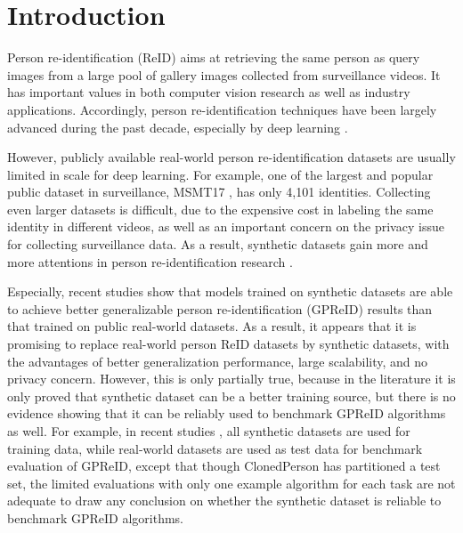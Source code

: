 \documentclass[10pt,twocolumn,letterpaper]{article}
\begin{document}
\section{Introduction}

Person re-identification (ReID) aims at retrieving the same person as query images from a large pool of gallery images collected from surveillance videos. It has important values in both computer vision research as well as industry applications. Accordingly, person re-identification techniques have been largely advanced during the past decade, especially by deep learning \cite{gong2014person,WU2019neuro,ye2022survey}.
 
However, publicly available real-world person re-identification datasets are usually limited in scale for deep learning. For example, one of the largest and popular public dataset in surveillance, MSMT17 \cite{wei2018person}, has only 4,101 identities. Collecting even larger datasets is difficult, due to the expensive cost in labeling the same identity in different videos, as well as an important concern on the privacy issue for collecting surveillance data. As a result, synthetic datasets gain more and more attentions in person re-identification research \cite{wang20rand, zhang2021unrealperson, Wang-2022-Clonedperson}. 

Especially, recent studies \cite{wang20rand, zhang2021unrealperson, Wang-2022-Clonedperson} show that models trained on synthetic datasets are able to achieve better generalizable person re-identification (GPReID) results than that trained on public real-world datasets. As a result, it appears that it is promising to replace real-world person ReID datasets by synthetic datasets, with the advantages of better generalization performance, large scalability, and no privacy concern. However, this is only partially true, because in the literature it is only proved that synthetic dataset can be a better training source, but there is no evidence showing that it can be reliably used to benchmark GPReID algorithms as well. 
For example, in recent studies \cite{wang20rand, zhang2021unrealperson, Wang-2022-Clonedperson}, all synthetic datasets are used for training data, while real-world datasets are used as test data for benchmark evaluation of GPReID, except that though ClonedPerson \cite{Wang-2022-Clonedperson} has partitioned a test set, the limited evaluations with only one example algorithm for each task are not adequate to draw any conclusion on whether the synthetic dataset is reliable to benchmark GPReID algorithms.
\end{document}
